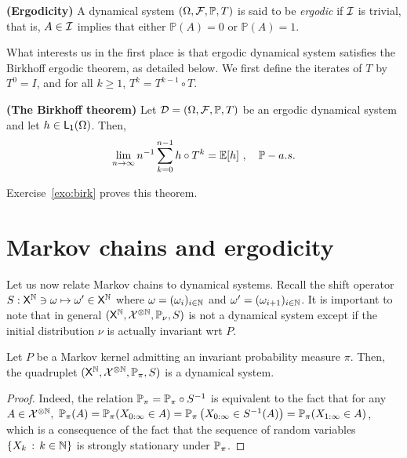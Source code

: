 \documentclass[english,graybox,envcountchap,envcountsame,sectrefs,shortlabels]{svmono}
\theoremstyle{style}
\newenvironment{svmultproof}{\small \begin{proof}}{\end{proof}}
\newcommand{\bs}{\begin{shaded}}
\newcommand{\es}{\end{shaded}}
\newcommand{\bfr}{\begin{framed}}
\newcommand{\efr}{\end{framed}}
\begin{document}
\bs
\begin{definition}
\textbf{(Ergodicity)}  A dynamical system $(\Omega,\mathcal{F},\mathbb{P},T)$
is said to be \emph{ergodic} if $\mathcal{I}$ is trivial, that is, $A\in\mathcal{I}$
implies that either $\mathbb{P}(A)=0$ or $\mathbb{P}(A)=1$.
\end{definition}
\es

What interests us in the first place is that ergodic dynamical system
satisfies the Birkhoff ergodic theorem, as detailed below. We first
define the iterates of $T$ by $T^{0}=I$, and for all $k\geq1$,
$T^{k}=T^{k-1}\circ T$.

\bfr
\begin{theorem}
\textbf{\label{thm:birk:dynam}(The Birkhoff theorem)} Let $\mathcal{D}=(\Omega,\mathcal{F},\mathbb{P},T)$
be an ergodic dynamical system and let $h\in\mathsf{L_{1}}(\Omega)$.
Then,
\[
\lim_{n\to\infty}n^{-1}\sum_{k=0}^{n-1}h\circ T^{k}=\mathbb{E}[h]\ ,\quad\mathbb{P}-a.s.
\]
\end{theorem}
\efr

Exercise~\ref{exo:birk} proves this theorem.



\section{Markov chains and ergodicity}

Let us now relate Markov chains to dynamical systems. Recall the shift
operator $S:\mathsf{X}^{\mathbb{N}}\ni\omega\mapsto\omega'\in\mathsf{X}^{\mathbb{N}}$
where $\omega=(\omega_{i})_{i\in\mathbb{N}}$ and $\omega'=(\omega_{i+1})_{i\in\mathbb{N}}$.
It is important to note that in general $(\mathsf{X}^{\mathbb{N}},\mathcal{X}^{\otimes\mathbb{N}},\mathbb{P}_{\nu},S)$
is not a dynamical system except if the initial distribution $\nu$
is actually invariant wrt $P$.

\bfr
\begin{lemma}
Let $P$ be a Markov kernel admitting an invariant probability measure
$\pi$. Then, the quadruplet $(\mathsf{X}^{\mathbb{N}},\mathcal{X}^{\otimes\mathbb{N}},\mathbb{P}_{\pi},S)$
is a dynamical system.
\end{lemma}
\efr
\begin{svmultproof}
Indeed, the relation $\mathbb{P}_{\pi}=\mathbb{P}_{\pi}\circ S^{-1}$ is equivalent
to the fact that for any $A\in\mathcal{X}^{\otimes\mathbb{N}},$ $\mathbb{P}_{\pi}(A)=\mathbb{P}_{\pi}(X_{0:\infty}\in A)=\mathbb{P}_{\pi}\left(X_{0:\infty}\in S^{-1}(A)\right)=\mathbb{P}_{\pi}(X_{1:\infty}\in A)$,
which is a consequence of the fact that the sequence of random variables
$\left\{ X_{k}\,:\,k\in\mathbb{N}\right\}$ is strongly stationary under $\mathbb{P}_{\pi}$.
\end{svmultproof}
\end{document}
